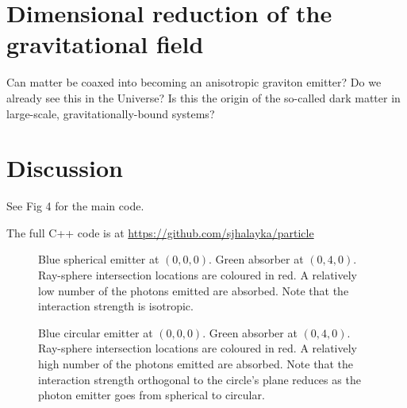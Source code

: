 \documentclass[12pt]{article}
\begin{document}
\section{Dimensional reduction of the gravitational field}

Can matter be coaxed into becoming an anisotropic graviton emitter?
Do we already see this in the Universe?
Is this the origin of the so-called dark matter in large-scale, gravitationally-bound systems?



\section{Discussion}

See Fig 4 for the main code.

The full C++ code is at \url{https://github.com/sjhalayka/particle}




\pagebreak





\begin{figure} 
\centering
{}
  \caption{
Blue spherical emitter at $(0, 0, 0)$. 
Green absorber at $(0, 4, 0)$. 
Ray-sphere intersection locations are coloured in red.
A relatively low number of the photons emitted are absorbed.
Note that the interaction strength is isotropic.
}
\end{figure}


\begin{figure} 
\centering
{}
  \caption{
Blue circular emitter at $(0, 0, 0)$. 
Green absorber at $(0, 4, 0)$. 
Ray-sphere intersection locations are coloured in red.
A relatively high number of the photons emitted are absorbed.
Note that the interaction strength orthogonal to the circle's plane reduces as the photon emitter goes from spherical to circular.
}
\end{figure}
\end{document}

